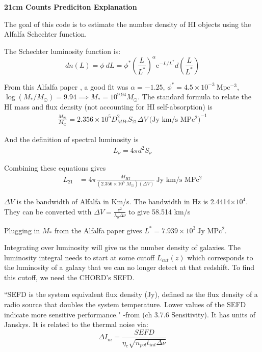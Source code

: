 \documentclass{article}
\newcommand{\val}[3]{#1 \times 10^{#2} \ \text{#3}}
\newcommand{\valdless}[2]{#1 \times 10^{#2}}
\begin{document}
\begin{center}
    \textbf{21cm Counts Prediciton Explanation}
\end{center}

The goal of this code is to estimate the number density of HI objects using the Alfalfa Schechter function.

The Schechter luminosity function is:
\begin{equation*}
    dn(L) = \phi~ dL = \phi^* \left(\frac{L}{L^*}\right)^\alpha \mathrm{e}^{-L/L^*} d\left(\frac{L}{L^*}\right)
\end{equation*}

From this Alfalfa paper \cite{2018_HIMF}, a good fit was $\alpha = -1.25$, $\phi^* = \val{4.5}{-3}{Mpc$^{-3}$}$, $\log(M_*/M_\odot) = 9.94 \implies M_* = 10^{9.94} M_\odot$. The standard formula to relate the HI mass and flux density (not accounting for HI self-absorption) is
\begin{align*}
    \frac{M_{21}}{M_{\odot}} = \valdless{2.356}{5} D^2_{MPc} S_{21} \Delta V \ \text{(Jy km/s MPc$^2$)}^{-1}
\end{align*}

And the definition of spectral luminosity is
\begin{align*}
    L_\nu = 4\pi d^2 S_\nu
\end{align*}

Combining these equations gives
\begin{align*}
    L_{21} &= 4\pi \frac{M_{HI}}{(\val{2.356}{5}{$M_{\odot}$})(\Delta V)} \ \text{Jy km/s MPc$^2$}
\end{align*}

$\Delta V$ is the bandwidth of Alfalfa in Km/s. The bandwidth in Hz is 2.4414$\times 10^4$. They can be converted with $\Delta V = \frac{c^2}{\lambda_0 \Delta \nu}$ to give 58.514 km/s

Plugging in $M_*$ from the Alfalfa paper gives $L^* = \val{7.939}{3}{Jy MPc$^2$}$.

Integrating over luminosity will give us the number density of galaxies. The luminosity integral needs to start at some cutoff $L_{cut}(z)$ which corresponds to the luminosity of a galaxy that we can no longer detect at that redshift. To find this cutoff, we need the CHORD's SEFD.

``SEFD is the system equivalent flux density (Jy), defined as the flux density of a radio source that doubles the system temperature. Lower values of the SEFD indicate more sensitive performance." -from \cite{NRAOlectures} (ch 3.7.6 Sensitivity). It has units of Janskys. It is related to the thermal noise via:
\begin{equation*}
    \Delta I_m = \frac{SEFD}{\eta_c\sqrt{n_{pol} t_{int} \Delta \nu}}
\end{equation*}
\end{document}
